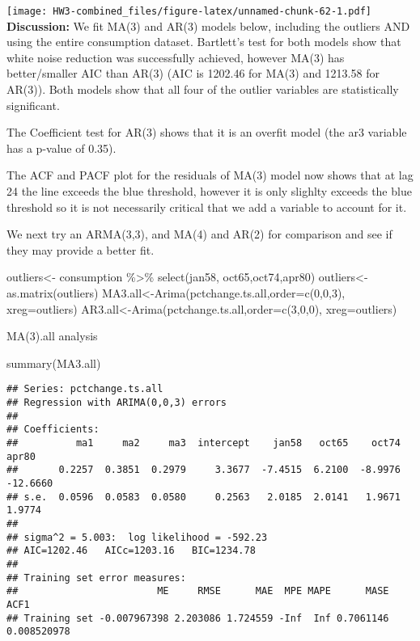 \documentclass[
]{article}
\newenvironment{Shaded}{\begin{snugshade}}{\end{snugshade}}
\newcommand{\AttributeTok}[1]{\textcolor[rgb]{0.77,0.63,0.00}{#1}}
\newcommand{\DecValTok}[1]{\textcolor[rgb]{0.00,0.00,0.81}{#1}}
\newcommand{\FunctionTok}[1]{\textcolor[rgb]{0.00,0.00,0.00}{#1}}
\newcommand{\NormalTok}[1]{#1}
\newcommand{\OtherTok}[1]{\textcolor[rgb]{0.56,0.35,0.01}{#1}}
\newcommand{\SpecialCharTok}[1]{\textcolor[rgb]{0.00,0.00,0.00}{#1}}
\begin{document}
\texttt{[image: HW3-combined\_files/figure-latex/unnamed-chunk-62-1.pdf]}
\textbf{Discussion:} We fit MA(3) and AR(3) models below, including the
outliers AND using the entire consumption dataset. Bartlett's test for
both models show that white noise reduction was successfully achieved,
however MA(3) has better/smaller AIC than AR(3) (AIC is 1202.46 for
MA(3) and 1213.58 for AR(3)). Both models show that all four of the
outlier variables are statistically significant.

The Coefficient test for AR(3) shows that it is an overfit model (the
ar3 variable has a p-value of 0.35).

The ACF and PACF plot for the residuals of MA(3) model now shows that at
lag 24 the line exceeds the blue threshold, however it is only slighlty
exceeds the blue threshold so it is not necessarily critical that we add
a variable to account for it.

We next try an ARMA(3,3), and MA(4) and AR(2) for comparison and see if
they may provide a better fit.

\begin{Shaded}
\begin{Highlighting}[]
\NormalTok{outliers}\OtherTok{\textless{}{-}}\NormalTok{ consumption }\SpecialCharTok{\%\textgreater{}\%} \FunctionTok{select}\NormalTok{(jan58, oct65,oct74,apr80)}
\NormalTok{outliers}\OtherTok{\textless{}{-}} \FunctionTok{as.matrix}\NormalTok{(outliers)}
\NormalTok{MA3.all}\OtherTok{\textless{}{-}}\FunctionTok{Arima}\NormalTok{(pctchange.ts.all,}\AttributeTok{order=}\FunctionTok{c}\NormalTok{(}\DecValTok{0}\NormalTok{,}\DecValTok{0}\NormalTok{,}\DecValTok{3}\NormalTok{), }\AttributeTok{xreg=}\NormalTok{outliers)}
\NormalTok{AR3.all}\OtherTok{\textless{}{-}}\FunctionTok{Arima}\NormalTok{(pctchange.ts.all,}\AttributeTok{order=}\FunctionTok{c}\NormalTok{(}\DecValTok{3}\NormalTok{,}\DecValTok{0}\NormalTok{,}\DecValTok{0}\NormalTok{), }\AttributeTok{xreg=}\NormalTok{outliers)}
\end{Highlighting}
\end{Shaded}

MA(3).all analysis

\begin{Shaded}
\begin{Highlighting}[]
\FunctionTok{summary}\NormalTok{(MA3.all)}
\end{Highlighting}
\end{Shaded}

\begin{verbatim}
## Series: pctchange.ts.all 
## Regression with ARIMA(0,0,3) errors 
## 
## Coefficients:
##          ma1     ma2     ma3  intercept    jan58   oct65    oct74     apr80
##       0.2257  0.3851  0.2979     3.3677  -7.4515  6.2100  -8.9976  -12.6660
## s.e.  0.0596  0.0583  0.0580     0.2563   2.0185  2.0141   1.9671    1.9774
## 
## sigma^2 = 5.003:  log likelihood = -592.23
## AIC=1202.46   AICc=1203.16   BIC=1234.78
## 
## Training set error measures:
##                        ME     RMSE      MAE  MPE MAPE      MASE        ACF1
## Training set -0.007967398 2.203086 1.724559 -Inf  Inf 0.7061146 0.008520978
\end{verbatim}
\end{document}
